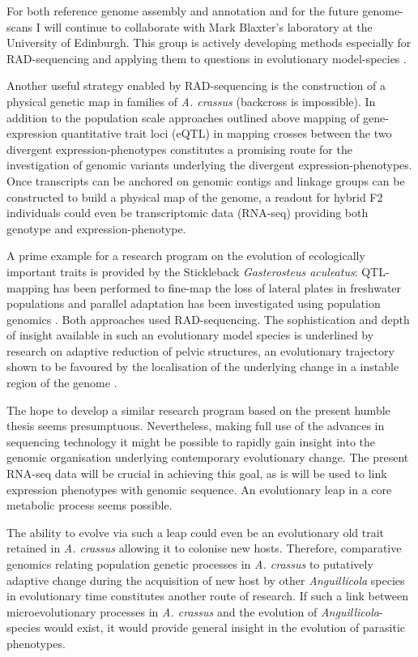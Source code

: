 For both reference genome assembly and annotation and for the future
genome-scans I will continue to collaborate with Mark Blaxter's
laboratory at the University of Edinburgh. This group is actively
developing methods especially for RAD-sequencing and applying them to
questions in evolutionary model-species \cite{pmid21681211}.

Another useful strategy enabled by RAD-sequencing is the construction
of a physical genetic map in families of \textit{A. crassus}
(backcross is impossible). In addition to the population scale
approaches outlined above mapping of gene-expression quantitative
trait loci (eQTL) in mapping crosses between the two divergent
expression-phenotypes constitutes a promising route for the
investigation of genomic variants underlying the divergent
expression-phenotypes. Once transcripts can be anchored on genomic
contigs and linkage groups can be constructed to build a physical map
of the genome, a readout for hybrid F2 individuals could even be
transcriptomic data (RNA-seq) providing both genotype and
expression-phenotype.

A prime example for a research program on the evolution of
ecologically important traits is provided by the Stickleback
\textit{Gasterosteus aculeatus}: QTL-mapping has been performed to
fine-map the loss of lateral plates in freshwater populations
\cite{pmid18852878} and parallel adaptation has been investigated
using population genomics \cite{pmid20195501}. Both approaches used
RAD-sequencing. The sophistication and depth of insight available in
such an evolutionary model species is underlined by research on
adaptive reduction of pelvic structures, an evolutionary trajectory
shown to be favoured by the localisation of the underlying change in a
instable region of the genome \cite{pmid20007865}.

The hope to develop a similar research program based on the present
humble thesis seems presumptuous. Nevertheless, making full use of the
advances in sequencing technology it might be possible to rapidly gain
insight into the genomic organisation underlying contemporary
evolutionary change. The present RNA-seq data will be crucial in
achieving this goal, as is will be used to link expression phenotypes
with genomic sequence. An evolutionary leap in a core metabolic
process seems possible.

The ability to evolve via such a leap could even be an evolutionary
old trait retained in \textit{A. crassus} allowing it to colonise new
hosts. Therefore, comparative genomics relating population genetic
processes in \textit{A. crassus} to putatively adaptive change during
the acquisition of new host by other \textit{Anguillicola} species in
evolutionary time constitutes another route of research. If such a
link between microevolutionary processes in \textit{A. crassus} and
the evolution of \textit{Anguillicola}-species would exist, it would
provide general insight in the evolution of parasitic phenotypes.

